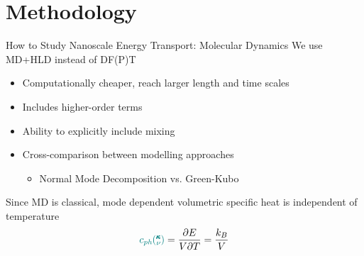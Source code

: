 \documentclass{beamer}
\newcommand{\kv}{\mspace{-4.0mu}\left(\mspace{-8.0mu}
\begin{smallmatrix}&\pmb{\kappa} \\&\nu\end{smallmatrix}
\mspace{-3.0mu}\right)}
\begin{document}
\section{Methodology}
\begin{frame}{How to Study Nanoscale Energy Transport: Molecular Dynamics}
We use MD+HLD instead of DF(P)T
\begin{itemize}
\item Computationally cheaper, reach larger length and time scales
\item Includes higher-order terms
\item Ability to explicitly include mixing
\item Cross-comparison between modelling approaches
\begin{itemize}
\item Normal Mode Decomposition vs. Green-Kubo
\end{itemize}
\end{itemize}


Since MD is classical, mode dependent volumetric specific heat is independent of temperature
\begin{equation}\label{EQ:Cph}
\textcolor{teal}{c_{ph}\kv}=\frac{\partial E}{V\partial T}=\frac{k_B}{V}	
\end{equation}
\end{frame}
\end{document}
